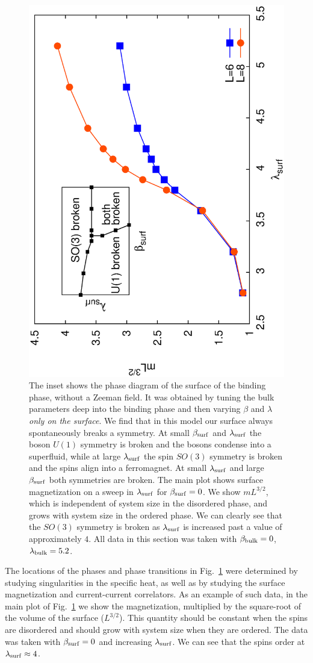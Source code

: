 \begin{figure}
\includegraphics[angle=-90,width=0.6\linewidth]{figures/heissurf.eps}
\caption{The inset shows the phase diagram of the surface of the binding phase, without a Zeeman field. It was obtained by tuning the bulk parameters deep into the binding phase and then varying $\beta$ and $\lambda$ {\em only on the surface}.  We find that in this model our surface always spontaneously breaks a symmetry. At small $\beta_{\rm surf}$ and $\lambda_{\rm surf}$ the boson $U(1)$ symmetry is broken and the bosons condense into a superfluid, while at large $\lambda_{\rm surf}$ the spin $SO(3)$ symmetry is broken and the spins align into a ferromagnet. At small $\lambda_{\rm surf}$ and large $\beta_{\rm surf}$ both symmetries are broken.  The main plot shows surface magnetization on a sweep in $\lambda_{\rm surf}$ for $\beta_{\rm surf}=0$. We show $mL^{3/2}$, which is independent of system size in the disordered phase, and grows with system size in the ordered phase. We can clearly see that the $SO(3)$ symmetry is broken as $\lambda_{\rm surf}$ is increased past a value of approximately $4$. All data in this section was taken with $\beta_{\rm bulk}=0$, $\lambda_{\rm bulk}=5.2$.}
\label{heissurf}
\end{figure}


The locations of the phases and phase transitions in Fig.~\ref{heissurf} were determined by studying singularities in the specific heat, as well as by studying the surface magnetization and current-current correlators. As an example of such data, in the main plot of Fig.~\ref{heissurf} we show the magnetization, multiplied by the square-root of the volume of the surface ($L^{3/2}$). This quantity should be constant when the spins are disordered and should grow with system size when they are ordered. The data was taken with $\beta_{\rm surf}=0$ and increasing $\lambda_{\rm surf}$. We can see that the spins order at $\lambda_{\rm surf} \approx 4$. 

